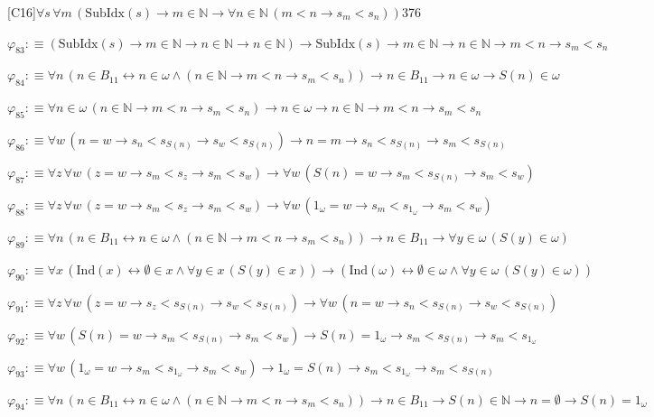 \begin{fullproof}{[C16]}{$\forall s\,\forall m\,(\mathrm{SubIdx}(s) \to m \in \mathbb{N} \to \forall n \in \mathbb{N}\,(m < n \to s_{m} < s_{n}))$}{376}
\begin{abbrevlist}
\item $\varphi_{83} :\equiv (\mathrm{SubIdx}(s) \to m \in \mathbb{N} \to n \in \mathbb{N} \to n \in \mathbb{N}) \to \mathrm{SubIdx}(s) \to m \in \mathbb{N} \to n \in \mathbb{N} \to m < n \to s_{m} < s_{n}$
\item $\varphi_{84} :\equiv \forall n\,(n \in B_{11} \leftrightarrow n \in \omega \land (n \in \mathbb{N} \to m < n \to s_{m} < s_{n})) \to n \in B_{11} \to n \in \omega \to S(n) \in \omega$
\item $\varphi_{85} :\equiv \forall n \in \omega\,(n \in \mathbb{N} \to m < n \to s_{m} < s_{n}) \to n \in \omega \to n \in \mathbb{N} \to m < n \to s_{m} < s_{n}$
\item $\varphi_{86} :\equiv \forall w\,(n = w \to s_{n} < s_{S(n)} \to s_{w} < s_{S(n)}) \to n = m \to s_{n} < s_{S(n)} \to s_{m} < s_{S(n)}$
\item $\varphi_{87} :\equiv \forall z\,\forall w\,(z = w \to s_{m} < s_{z} \to s_{m} < s_{w}) \to \forall w\,(S(n) = w \to s_{m} < s_{S(n)} \to s_{m} < s_{w})$
\item $\varphi_{88} :\equiv \forall z\,\forall w\,(z = w \to s_{m} < s_{z} \to s_{m} < s_{w}) \to \forall w\,(1_{\omega} = w \to s_{m} < s_{1_{\omega}} \to s_{m} < s_{w})$
\item $\varphi_{89} :\equiv \forall n\,(n \in B_{11} \leftrightarrow n \in \omega \land (n \in \mathbb{N} \to m < n \to s_{m} < s_{n})) \to n \in B_{11} \to \forall y \in \omega\,(S(y) \in \omega)$
\item $\varphi_{90} :\equiv \forall x\,(\mathrm{Ind}(x) \leftrightarrow \emptyset \in x \land \forall y \in x\,(S(y) \in x)) \to (\mathrm{Ind}(\omega) \leftrightarrow \emptyset \in \omega \land \forall y \in \omega\,(S(y) \in \omega))$
\item $\varphi_{91} :\equiv \forall z\,\forall w\,(z = w \to s_{z} < s_{S(n)} \to s_{w} < s_{S(n)}) \to \forall w\,(n = w \to s_{n} < s_{S(n)} \to s_{w} < s_{S(n)})$
\item $\varphi_{92} :\equiv \forall w\,(S(n) = w \to s_{m} < s_{S(n)} \to s_{m} < s_{w}) \to S(n) = 1_{\omega} \to s_{m} < s_{S(n)} \to s_{m} < s_{1_{\omega}}$
\item $\varphi_{93} :\equiv \forall w\,(1_{\omega} = w \to s_{m} < s_{1_{\omega}} \to s_{m} < s_{w}) \to 1_{\omega} = S(n) \to s_{m} < s_{1_{\omega}} \to s_{m} < s_{S(n)}$
\item $\varphi_{94} :\equiv \forall n\,(n \in B_{11} \leftrightarrow n \in \omega \land (n \in \mathbb{N} \to m < n \to s_{m} < s_{n})) \to n \in B_{11} \to S(n) \in \mathbb{N} \to n = \emptyset \to S(n) = 1_{\omega}$

\end{abbrevlist}
\end{fullproof}
